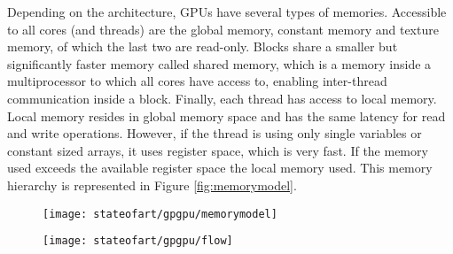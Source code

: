 
Depending on the architecture, GPUs have several types of memories.
Accessible to all cores (and threads) are the global memory, constant memory and texture memory, of which the last two are read-only.
Blocks share a smaller but significantly faster memory called shared memory, which is a memory inside a multiprocessor to which all cores have access to, enabling inter-thread communication inside a block.
Finally, each thread has access to local memory.
Local memory resides in global memory space and has the same latency for read and write operations.
However, if the thread is using only single variables or constant sized arrays, it uses register space, which is very fast.
If the memory used exceeds the available register space the local memory used.
This memory hierarchy is represented in Figure \ref{fig:memorymodel}.

\begin{figure}[t]
\centering
\begin{minipage}[b]{.5\textwidth}
	\centering
	\texttt{[image: stateofart/gpgpu/memorymodel]}
	\label{fig:memorymodel}  
\end{minipage}%
\begin{minipage}[b]{.5\textwidth}
        \centering
        \texttt{[image: stateofart/gpgpu/flow]}
        \label{fig:cudaflow}
\end{minipage}
\end{figure}


